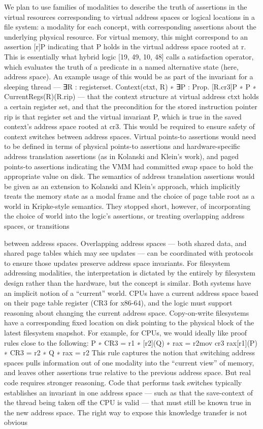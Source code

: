 We plan to use families of modalities to describe
the truth of assertions in the virtual resources corresponding to virtual address spaces or logical
locations in a file system: a modality for each concept, with corresponding assertions about the
underlying physical resource.
For virtual memory, this might correspond to an assertion [r]P indicating that P holds in the
virtual address space rooted at r. This is essentially what hybrid logic [19, 49, 10, 48] calls a
satisfaction operator, which evaluates the truth of a predicate in a named alternative state (here,
address space). An example usage of this would be as part of the invariant for a sleeping thread
— ∃R : registerset. Context(ctxt, R) ∗ ∃P : Prop. [R.cr3]P ∗ {P ∗ CurrentRegs(R)}(R.rip) — that the
context structure at virtual address ctxt holds a certain register set, and that the precondition for
the stored instruction pointer rip is that register set and the virtual invariant P, which is true in
the saved context’s address space rooted at cr3. This would be required to ensure safety of context
switches between address spaces.
Virtual points-to assertions would need to be defined in terms of physical points-to assertions
and hardware-specific address translation assertions (as in Kolanski and Klein’s work), and paged
points-to assertions indicating the VMM had committed swap space to hold the appropriate value
on disk. The semantics of address translation assertions would be given as an extension to Kolanski
and Klein’s approach, which implicitly treats the memory state as a modal frame and the choice of
page table root as a world in Kripke-style semantics. They stopped short, however, of incorporating
the choice of world into the logic’s assertions, or treating overlapping address spaces, or transitions

between address spaces. Overlapping address spaces — both shared data, and shared page tables
which may see updates — can be coordinated with protocols to ensure those updates preserve
address space invariants. For filesystem addressing modalities, the interpretation is dictated by the
entirely by filesystem design rather than the hardware, but the concept is similar.
Both systems have an implicit notion of a “current” world. CPUs have a current address space
based on their page table register (CR3 for x86-64), and the logic must support reasoning about
changing the current address space. Copy-on-write filesystems have a corresponding fixed location
on disk pointing to the physical block of the latest filesystem snapshot. For example, for CPUs, we
would ideally like proof rules close to the following:
{P ∗ CR3 = r1 ∗ [r2](Q) ∗ rax = r2}mov cr3 rax{[r1](P) ∗ CR3 = r2 ∗ Q ∗ rax = r2}
This rule captures the notion that switching address spaces pulls information out of one modality
into the “current view” of memory, and leaves other assertions true relative to the previous address
space. But real code requires stronger reasoning. Code that performs task switches typically
establishes an invariant in one address space — such as that the save-context of the thread being
taken off the CPU is valid — that must still be known true in the new address space. The right
way to expose this knowledge transfer is not obvious
